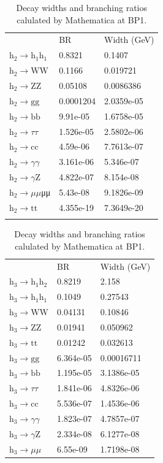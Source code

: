 \documentclass[12pt]{article}
\begin{document}
	\begin{table}[htpb]
		\centering
		\caption{Decay widths and branching ratios calulated by Mathematica at BP1.}
		\label{tab:MA_decay_widths_BR}
		\begin{tabular}{lll}
									  & BR        & Width (GeV) \\
			$\text{h}_2\to\text{h}_1\text{h}_1$     & 0.8321    & 0.1407      \\
			$\text{h}_2\to\text{WW}$       & 0.1166    & 0.019721    \\
			$\text{h}_2\to\text{ZZ}$       & 0.05108   & 0.0086386   \\
			$\text{h}_2\to\text{gg}$       & 0.0001204 & 2.0359e-05  \\
			$\text{h}_2\to\text{bb}$       & 9.91e-05  & 1.6758e-05  \\
			$\text{h}_2\to\tau\tau$       & 1.526e-05 & 2.5802e-06  \\
			$\text{h}_2\to\text{cc}$       & 4.59e-06  & 7.7613e-07  \\
			$\text{h}_2\to\gamma\gamma$       & 3.161e-06 & 5.346e-07   \\
			$\text{h}_2\to\gamma\text{Z}$       & 4.822e-07 & 8.154e-08   \\
			$\text{h}_2\to\mu\mu$μμ       & 5.43e-08  & 9.1826e-09  \\
			$\text{h}_2\to\text{tt}$       & 4.355e-19 & 7.3649e-20  \\
			\\
		\end{tabular}		
		\begin{tabular}{lll}
								  & BR        & Width (GeV) \\
			$\text{h}_3\to\text{h}_1\text{h}_2$ & 0.8219    & 2.158       \\
			$\text{h}_3\to\text{h}_1\text{h}_1$ & 0.1049    & 0.27543     \\
			$\text{h}_3\to\text{WW}$   & 0.04131   & 0.10846     \\
			$\text{h}_3\to\text{ZZ}$   & 0.01941   & 0.050962    \\
			$\text{h}_3\to\text{tt}$   & 0.01242   & 0.032613    \\
			$\text{h}_3\to\text{gg}$   & 6.364e-05 & 0.00016711  \\
			$\text{h}_3\to\text{bb}$   & 1.195e-05 & 3.1386e-05  \\
			$\text{h}_3\to\tau\tau$   & 1.841e-06 & 4.8326e-06  \\
			$\text{h}_3\to\text{cc}$   & 5.536e-07 & 1.4536e-06  \\
			$\text{h}_3\to\gamma\gamma$   & 1.823e-07 & 4.7857e-07  \\
			$\text{h}_3\to\gamma\text{Z}$   & 2.334e-08 & 6.1277e-08  \\
			$\text{h}_3\to\mu\mu$   & 6.55e-09  & 1.7198e-08  
		\end{tabular}
	\end{table}
\end{document}
